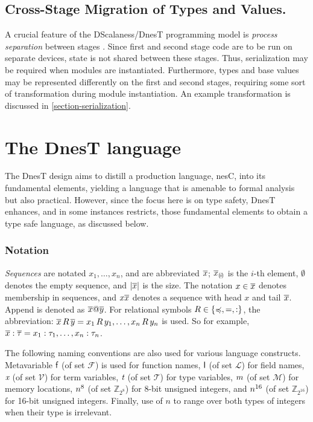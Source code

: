 \subsection{Cross-Stage Migration of Types and Values.} 

A crucial feature of the DScalaness/DnesT programming model is \emph{process separation} between
stages \cite{FramedML}. Since first and second stage code are to be run on separate devices,
state is not shared between these stages. Thus, serialization may be required when modules are
instantiated. Furthermore, types and base values may be represented differently on the first and
second stages, requiring some sort of transformation during module instantiation. An example
transformation is discussed in \autoref{section-serialization}.

\section{The DnesT language}
\label{section-dnest-theory}
 
The DnesT design aims to distill a production language, nesC, into its fundamental elements,
yielding a language that is amenable to formal analysis but also practical. However, since the
focus here is on type safety, DnesT enhances, and in some instances restricts, those fundamental
elements to obtain a type safe language, as discussed below.

\subsubsection{Notation}

\emph{Sequences} are notated $x_1,\ldots,x_n$, and are abbreviated $\overline{x}$;
$\overline{x}_{(\mskip -2.5mu i\mskip -2.5mu)}$ is the $i$-th element, $\emptyset$ denotes the empty sequence, and
$|\overline{x}|$ is the size. The notation $x \in \overline{x}$ denotes membership in sequences, and
$x\overline{x}$ denotes a sequence with head $x$ and tail $\overline{x}$. Append is denoted as
$\overline{x}@\overline{y}$. For relational symbols $R \in \{ \preccurlyeq, =, : \}$, the abbreviation:
$\overline{x}\, R\, \overline{y} = x_1\, R\, y_1, \ldots, x_n\, R\, y_n$ is used. So for example,
$\overline{x} : \overline{\tau} = x_1 : \tau_1,\ldots,x_n : \tau_n$.

The following naming conventions are also used for various language constructs. Meta\-variable
$\textsf{f}$ (of set $\mathcal{F}$) is used for function names, $\textsf{l}$ (of set $\mathcal{L}$) for
field names, $\textit{x}$ (of set $\mathcal{V}$) for term variables, $\textit{t}$ (of set $\mathcal{T}$)
for type variables, $m$ (of set $\mathcal{M}$) for memory locations, $n^{8}$ (of set
$\mathbb{Z}_{2^8}$) for 8-bit unsigned integers, and $n^{16}$ (of set $\mathbb{Z}_{2^{16}}$)
for 16-bit unsigned integers. Finally, use of $n$ to range over both types of integers when
their type is irrelevant.

